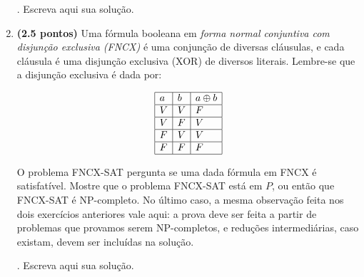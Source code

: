 \documentclass[12pt]{article}
\newcommand{\resposta}[1]{ \noindent {\bf Solução}.{\color{blue} #1}}
\begin{document}
\begin{enumerate}
  \resposta{
    Escreva aqui sua solução.
  }
  
\item {\bf (2.5 pontos)} Uma fórmula booleana em {\it forma normal conjuntiva com disjunção exclusiva (FNCX)} é uma conjunção de diversas cláusulas, e cada cláusula é uma disjunção exclusiva (XOR) de diversos literais. Lembre-se que a disjunção exclusiva é dada por:

  $$\begin{array}{|l|l|l|}\hline
      a & b & a \oplus b \\ \hline
      V & V & F \\ \hline
      V & F & V \\ \hline
      F & V & V \\ \hline
      F & F & F \\ \hline
  \end{array}$$

  O problema FNCX-SAT pergunta se uma dada fórmula em FNCX é
  satisfatível. Mostre que o problema FNCX-SAT está em $P$, ou então
  que FNCX-SAT é NP-completo. No último caso, a mesma observação feita
  nos dois exercícios anteriores vale aqui: a prova deve ser feita a
  partir de problemas que provamos serem NP-completos, e reduções
  intermediárias, caso existam, devem ser incluídas na solução.

  \resposta{
    Escreva aqui sua solução.
  }
\end{enumerate}
\end{document}
